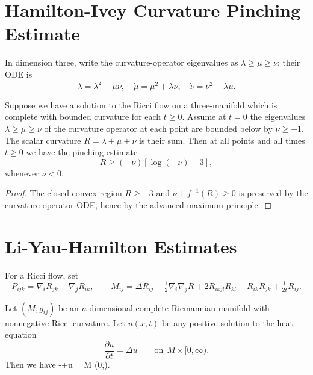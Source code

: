 \section{Hamilton-Ivey Curvature Pinching Estimate}

In dimension three, write the curvature-operator eigenvalues as
$\lambda\ge\mu\ge\nu$; their ODE is
\[
\dot\lambda=\lambda^2+\mu\nu,\quad
\dot\mu=\mu^2+\lambda\nu,\quad
\dot\nu=\nu^2+\lambda\mu.
\]

\begin{theorem}
  \label{thm:cz-hamiltonivey-curvature-pinching}
Suppose we have a solution to the Ricci flow on a three-manifold
which is complete with bounded curvature for each $t\geq0$. Assume
at $t=0$ the eigenvalues $\lambda\geq\mu\geq\nu$ of the curvature
operator at each point are bounded below by $\nu\geq-1$. The
scalar curvature $R=\lambda+\mu+\nu$ is their sum. Then at all
points and all times $t\geq0$ we have the pinching estimate
$$
R\geq (-\nu)[\log(-\nu)-3],
$$
whenever $\nu<0$.
\end{theorem}

\begin{proof}
  \sketch The closed convex region $R\ge-3$ and $\nu+f^{-1}(R)\ge0$ is preserved by the curvature-operator ODE, hence by the advanced maximum principle.
\end{proof}

\section{Li-Yau-Hamilton Estimates}

For a Ricci flow, set
\[
P_{ijk}=\nabla_iR_{jk}-\nabla_jR_{ik},\qquad
M_{ij}=\Delta R_{ij}-\tfrac12\nabla_i\nabla_jR
+2R_{ikjl}R_{kl}-R_{ik}R_{jk}+\tfrac1{2t}R_{ij}.
\]

\begin{theorem}
  \label{thm:cz-liyau-differential-harnack-estimate}
Let $(M, g_{ij})$ be an $n$-dimensional complete Riemannian
manifold with nonnegative Ricci curvature. Let $u(x,t)$ be any
positive solution to the heat equation
$$
\frac{\partial u}{\partial t}=\Delta u \qquad {\text{on}} \ \
M\times [0,\infty).
$$
Then we have \be {}-+u \qquad {} \ \ M\times
(0,\infty).%
\ee
\end{theorem}

